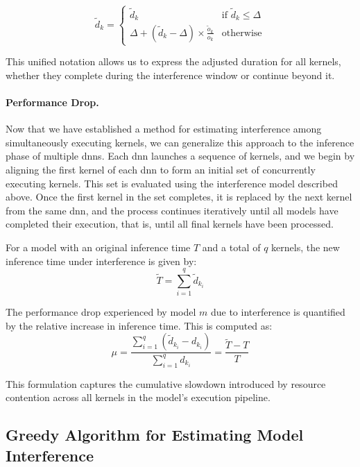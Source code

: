 \begin{equation}
	\tilde{d}_k =
	\begin{cases}
		\tilde{d}_k & \text{if } \tilde{d}_k \leq \Delta \\
		\Delta + \left( \tilde{d}_k - \Delta \right) \times \frac{\tilde{o}_k}{o_k} & \text{otherwise}
	\end{cases}
\end{equation}

This unified notation allows us to express the adjusted duration for all kernels, whether they complete during the interference window or continue beyond it.

\paragraph{Performance Drop.} Now that we have established a method for estimating interference among simultaneously executing kernels, we can generalize this approach to the inference phase of multiple \acrshort{dnn}s. Each \acrshort{dnn} launches a sequence of kernels, and we begin by aligning the first kernel of each \acrshort{dnn} to form an initial set of concurrently executing kernels. This set is evaluated using the interference model described above. Once the first kernel in the set completes, it is replaced by the next kernel from the same \acrshort{dnn}, and the process continues iteratively until all models have completed their execution, that is, until all final kernels have been processed.

For a model with an original inference time $T$ and a total of $q$ kernels, the new inference time under interference is given by:
\begin{equation*}
	\tilde{T} = \sum_{i=1}^{q} \tilde{d}_{k_i}
\end{equation*}

The performance drop experienced by model $m$ due to interference is quantified by the relative increase in inference time. This is computed as:
\begin{equation}\label{eq:performance_drop}
	\mu = \frac{\sum_{i=1}^{q} (\tilde{d}_{k_i} - d_{k_i})}{\sum_{i=1}^{q} d_{k_i}} = \frac{\tilde{T} - T}{T}
\end{equation}

This formulation captures the cumulative slowdown introduced by resource contention across all kernels in the model's execution pipeline.

\subsection{Greedy Algorithm for Estimating Model Interference}

